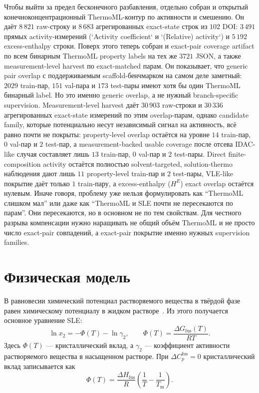 \documentclass[11pt]{article}
\newcommand{\Tm}{T_{\mathrm m}}
\newcommand{\dHfus}{\Delta H_{\mathrm{fus}}}
\theoremstyle{definition}
\begin{document}
Чтобы выйти за предел бесконечного разбавления, отдельно собран и открытый конечноконцентрационный ThermoML-контур по активности и смешению. Он даёт $8\,821$ raw-строку и $8\,683$ агрегированных exact-state строк из $102$ DOI: $3\,491$ прямых activity-измерений (`Activity coefficient` и `(Relative) activity`) и $5\,192$ excess-enthalpy строки. Поверх этого теперь собран и exact-pair coverage artifact по всем бинарным ThermoML property labels на тех же $3721$ JSON, а также measurement-level harvest по exact-matched парам. Он показывает, что generic pair overlap с поддерживаемым scaffold-бенчмарком на самом деле заметный: $2029$ train-пар, $151$ val-пара и $173$ test-пары имеют хотя бы один ThermoML бинарный label. Но это именно generic overlap, а не нужный branch-specific supervision. Measurement-level harvest даёт $30\,903$ raw-строки и $30\,336$ агрегированных exact-state измерений по этим overlap-парам, однако candidate family, которые потенциально несут независимый сигнал на активность, всё равно почти не покрыты: property-level overlap остаётся на уровне $14$ train-пар, $0$ val-пар и $2$ test-пар, а measurement-backed usable coverage после отсева IDAC-like случая составляет лишь $13$ train-пар, $0$ val-пар и $2$ test-пары. Direct finite-composition activity остаётся полностью solvent-targeted, solution-thermo наблюдения дают лишь $11$ property-level train-пар и $2$ test-пары, VLE-like покрытие даёт только $1$ train-пару, а excess-enthalpy (\(H^E\)) exact overlap остаётся нулевым. Иначе говоря, проблему уже нельзя формулировать как ``ThermoML слишком мал'' или даже как ``ThermoML и SLE почти не пересекаются по парам''. Они пересекаются, но в основном не по тем свойствам. Для честного разрыва компенсации нужно наращивать не общий объём ThermoML и не просто число exact-pair совпадений, а exact-pair покрытие именно нужных supervision families.

\section{Физическая модель}

В равновесии химический потенциал растворяемого вещества в твёрдой фазе равен химическому потенциалу в жидком растворе~\cite{prausnitz1998,hildebrand1970}. Из этого получается основное уравнение SLE:
\begin{equation}
    \ln x_2 = -\Phi(T)-\ln\gamma_2,
    \qquad
    \Phi(T)=\frac{\Delta G_{\mathrm{fus}}(T)}{RT}.
    \label{eq:sle-short}
\end{equation}
Здесь $\Phi(T)$ --- кристаллический вклад, а $\gamma_2$ --- коэффициент активности растворяемого вещества в насыщенном растворе. При $\Delta C_p^{\mathrm{fus}}=0$ кристаллический вклад записывается как
\begin{equation*}
    \Phi(T)
    =\frac{\dHfus}{R}\left(\frac{1}{T}-\frac{1}{\Tm}\right).
\end{equation*}
\end{document}
